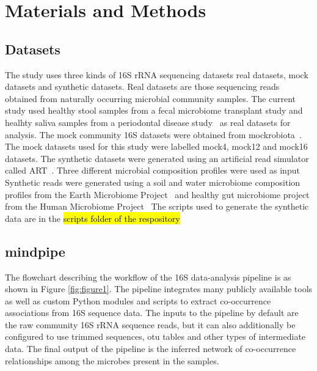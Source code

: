 
\section*{Materials and Methods}

  \subsection*{Datasets}

  \vspace{-5mm}
  The study uses three kinds of 16S rRNA sequencing datasets \- real datasets, mock datasets and synthetic datasets.
  Real datasets are those sequencing reads obtained from naturally occurring microbial community samples.
  The current study used healthy stool samples from a fecal microbiome transplant study \cite{Kang2017} and healhty saliva samples from a periodontal disease study~\cite{Chen2018} as real datasets for analysis.
  The mock community 16S datasets were obtained from mockrobiota~\cite{Bokulich2016}.
  The mock datasets used for this study were labelled mock4, mock12 and mock16 datasets.
  The synthetic datasets were generated using an artificial read simulator called ART~\cite{Huang2012}.
  Three different microbial composition profiles were used as input
  Synthetic reads were generated using a soil and water microbiome composition profiles from the Earth Microbiome Project~\cite{Thompson2017} and healthy gut microbiome project from the Human Microbiome Project~\cite{HumanMicrobiomeProjectConsortium2012}
  The scripts used to generate the synthetic data are in the \hl{scripts folder of the respository}

  \subsection*{mindpipe}

  \vspace{-5mm}
  The flowchart describing the workflow of the 16S data-analysis pipeline is as shown in Figure \ref{fig:figure1}.
  The pipeline integrates many publicly available tools as well as custom Python modules and scripts to extract co-occurrence associations from 16S sequence data.
  The inputs to the pipeline by default are the raw community 16S rRNA sequence reads, but it can also additionally be configured to use trimmed sequences, \ac{otu} tables and other types of intermediate data.
  The final output of the pipeline is the inferred network of co-occurrence relationships among the microbes present in the samples.

